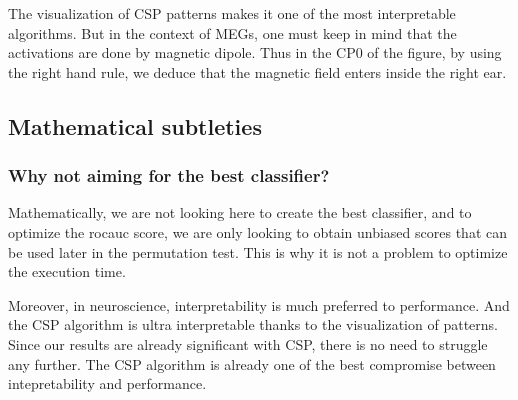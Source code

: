 The visualization of CSP patterns makes it one of the most interpretable algorithms. But in the context of MEGs, one must keep in mind that the activations are done by magnetic dipole. Thus in the CP0 of the figure, by using the right hand rule, we deduce that the magnetic field enters inside the right ear.

\subsection{Mathematical subtleties}

\subsubsection{Why not aiming for the best classifier?}
Mathematically, we are not looking here to create the best classifier, and to optimize the rocauc score, we are only looking to obtain unbiased scores that can be used later in the permutation test. This is why it is not a problem to optimize the execution time.

Moreover, in neuroscience, interpretability is much preferred to performance. And the CSP algorithm is ultra interpretable thanks to the visualization of patterns. Since our results are already significant with CSP, there is no need to struggle any further. The CSP algorithm is already one of the best compromise between intepretability and performance.





